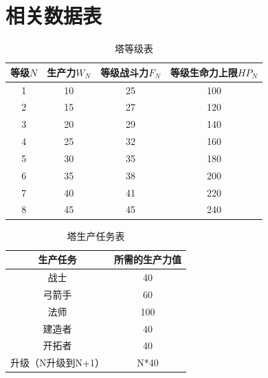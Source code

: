 \documentclass[a4paper,4pt]{article}
\begin{document}

\section{相关数据表}
\begin{table}[htbp]
	\centering
	\caption{塔等级表}
	\label{塔等级表}%
	\begin{tabular}{c|c|c|c}
		\hline
		等级$N$ & 生产力$W_N$ & 等级战斗力$F_N$ & 等级生命力上限$HP_N$ \bigstrut \\
		\hline
		1       & 10          & 25              & 100 \bigstrut                  \\
		\hline
		2       & 15          & 27              & 120 \bigstrut                  \\
		\hline
		3       & 20          & 29              & 140 \bigstrut                  \\
		\hline
		4       & 25          & 32              & 160 \bigstrut                  \\
		\hline
		5       & 30          & 35              & 180 \bigstrut                  \\
		\hline
		6       & 35          & 38              & 200 \bigstrut                  \\
		\hline
		7       & 40          & 41              & 220 \bigstrut                  \\
		\hline
		8       & 45          & 45              & 240 \bigstrut                  \\
		\hline
	\end{tabular}%

\end{table}%




\begin{table}[htbp]
	\centering
	\caption{塔生产任务表}
	\begin{tabular}{c|c}
		\hline
		生产任务           & 所需的生产力值 \bigstrut \\
		\hline
		战士               & 40 \bigstrut             \\
		\hline
		弓箭手             & 60 \bigstrut             \\
		\hline
		法师               & 100 \bigstrut            \\
		\hline
		建造者             & 40 \bigstrut             \\
		\hline
		开拓者             & 40 \bigstrut             \\
		\hline
		升级（N升级到N+1） & N*40 \bigstrut           \\
		\hline
	\end{tabular}%
	\label{塔生产}%
\end{table}%
\end{document}
